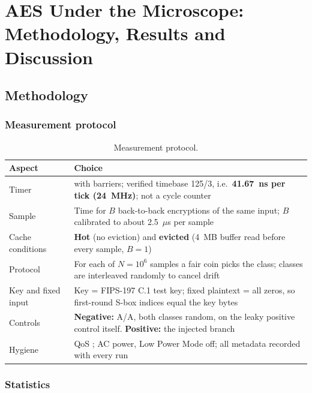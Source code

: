 \chapter{AES Under the Microscope: Methodology, Results and Discussion}
\label{ch:aesres}

\section{Methodology}
\label{sec:method}

\subsection{Measurement protocol}

\begin{table}[htbp]
\centering
\small
\renewcommand{\arraystretch}{1.15}
\begin{tabular}{@{}P{0.18\textwidth}P{0.72\textwidth}@{}}
\toprule
Aspect & Choice \\
\midrule
Timer &  with  barriers; verified timebase 125/3, i.e.\ \textbf{41.67~ns per tick (24~MHz)}; not a cycle counter \\
Sample & Time for $B$ back-to-back encryptions of the same input; $B$ calibrated to about 2.5~$\mu$s per sample \\
Cache conditions & \textbf{Hot} (no eviction) and \textbf{evicted} (4~MB buffer read before every sample, $B = 1$) \\
Protocol & For each of $N = 10^6$ samples a fair coin picks the class; classes are interleaved randomly to cancel drift \\
Key and fixed input & Key = FIPS-197 C.1 test key; fixed plaintext = all zeros, so first-round S-box indices equal the key bytes \\
Controls & \textbf{Negative:} A/A, both classes random, on the leaky positive control itself. \textbf{Positive:} the injected branch \\
Hygiene & QoS ; AC power, Low Power Mode off; all metadata recorded with every run \\
\bottomrule
\end{tabular}
\caption{Measurement protocol.}
\label{tab:protocol}
\end{table}

\subsection{Statistics}

